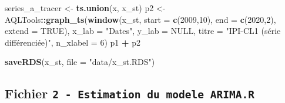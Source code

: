 \documentclass[french]{article}
\newenvironment{Shaded}{\begin{snugshade}}{\end{snugshade}}
\newcommand{\DataTypeTok}[1]{\textcolor[rgb]{0.13,0.29,0.53}{#1}}
\newcommand{\DecValTok}[1]{\textcolor[rgb]{0.00,0.00,0.81}{#1}}
\newcommand{\KeywordTok}[1]{\textcolor[rgb]{0.13,0.29,0.53}{\textbf{#1}}}
\newcommand{\NormalTok}[1]{#1}
\newcommand{\OperatorTok}[1]{\textcolor[rgb]{0.81,0.36,0.00}{\textbf{#1}}}
\newcommand{\OtherTok}[1]{\textcolor[rgb]{0.56,0.35,0.01}{#1}}
\newcommand{\StringTok}[1]{\textcolor[rgb]{0.31,0.60,0.02}{#1}}
\begin{document}
\begin{Shaded}
\begin{Highlighting}[]
\NormalTok{series_a_tracer <-}\StringTok{ }\KeywordTok{ts.union}\NormalTok{(x, x_st)}
\NormalTok{p2 <-}\StringTok{ }\NormalTok{AQLTools}\OperatorTok{::}\KeywordTok{graph_ts}\NormalTok{(}\KeywordTok{window}\NormalTok{(x_st,}
                                \DataTypeTok{start =} \KeywordTok{c}\NormalTok{(}\DecValTok{2009}\NormalTok{,}\DecValTok{10}\NormalTok{),}
                                \DataTypeTok{end =} \KeywordTok{c}\NormalTok{(}\DecValTok{2020}\NormalTok{,}\DecValTok{2}\NormalTok{),}
                                \DataTypeTok{extend =} \OtherTok{TRUE}\NormalTok{), }\DataTypeTok{x_lab =} \StringTok{"Dates"}\NormalTok{, }\DataTypeTok{y_lab =} \OtherTok{NULL}\NormalTok{,}
                         \DataTypeTok{titre =} \StringTok{"IPI-CL1 (série différenciée)"}\NormalTok{, }\DataTypeTok{n_xlabel =} \DecValTok{6}\NormalTok{)}
\NormalTok{p1 }\OperatorTok{+}\StringTok{ }\NormalTok{p2}

\KeywordTok{saveRDS}\NormalTok{(x_st, }\DataTypeTok{file =} \StringTok{"data/x_st.RDS"}\NormalTok{)}
\end{Highlighting}
\end{Shaded}

\hypertarget{fichier-2---estimation-du-modele-arima.r}{%
\subsection{\texorpdfstring{Fichier \texttt{2\ -\ Estimation\ du\ modele\ ARIMA.R}}{Fichier 2 - Estimation du modele ARIMA.R}}\label{fichier-2---estimation-du-modele-arima.r}}
\end{document}
